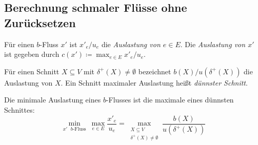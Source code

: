 \subsection{Berechnung schmaler Flüsse ohne Zurücksetzen}

\begin{frame}
	\begin{definition}
		Für einen $b$-Fluss $x'$ ist $x'_e/u_e$ die \emph{Auslastung von $e\in E$}.
		Die \emph{Auslastung von $x'$} ist gegeben durch $c(x')\coloneq \max_{e\in E} x'_e / u_e$.	
	\end{definition}
	\pause\begin{definition}
	Für einen Schnitt $X\subseteq V$ mit $\delta^+(X)\neq \emptyset$ bezeichnet $b(X) / u(\delta^+(X))$ die Auslastung von $X$.
	Ein Schnitt maximaler Auslastung heißt \emph{dünnster Schnitt}.
	\end{definition}
	\pause\begin{theorem}
		Die minimale Auslastung eines $b$-Flusses ist die maximale eines dünnsten Schnittes:
		\[
		\min_{\text{$x'$ $b$-Fluss}}~ \max_{e\in E} \frac{x'_e}{u_e} = \max_{\substack{X\subseteq V\\ \delta^+(X) \neq \emptyset}} \frac{b(X)}{u(\delta^+(X))}
		\]
	\end{theorem}
\end{frame}


